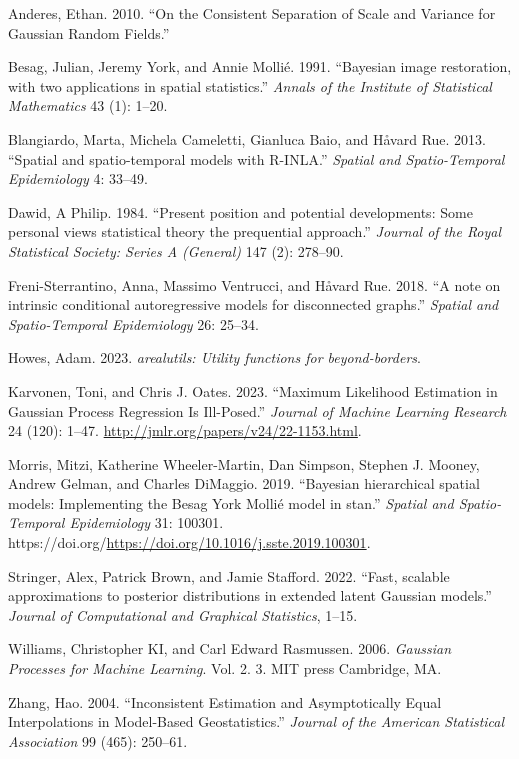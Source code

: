\documentclass[
  12pt,
]{article}
\newlength{\cslhangindent}
\newenvironment{CSLReferences}[2] %
 {\begin{list}{}{%
  \setlength{\itemindent}{0pt}
  \setlength{\leftmargin}{0pt}
  \setlength{\parsep}{0pt}
  \ifodd #1
   \setlength{\leftmargin}{\cslhangindent}
   \setlength{\itemindent}{-1\cslhangindent}
  \fi
  \setlength{\itemsep}{#2\baselineskip}}}
 {\end{list}}
\begin{document}
\label{refs}
\begin{CSLReferences}{1}{0}
Anderes, Ethan. 2010. {``On the Consistent Separation of Scale and
Variance for Gaussian Random Fields.''}

Besag, Julian, Jeremy York, and Annie Mollié. 1991. {``{Bayesian image
restoration, with two applications in spatial statistics}.''}
\emph{Annals of the Institute of Statistical Mathematics} 43 (1): 1--20.

Blangiardo, Marta, Michela Cameletti, Gianluca Baio, and Håvard Rue.
2013. {``{Spatial and spatio-temporal models with R-INLA}.''}
\emph{Spatial and Spatio-Temporal Epidemiology} 4: 33--49.

Dawid, A Philip. 1984. {``{Present position and potential developments:
Some personal views statistical theory the prequential approach}.''}
\emph{Journal of the Royal Statistical Society: Series A (General)} 147
(2): 278--90.

Freni-Sterrantino, Anna, Massimo Ventrucci, and Håvard Rue. 2018. {``{A
note on intrinsic conditional autoregressive models for disconnected
graphs}.''} \emph{Spatial and Spatio-Temporal Epidemiology} 26: 25--34.

Howes, Adam. 2023. \emph{{arealutils: Utility functions for
beyond-borders}}.

Karvonen, Toni, and Chris J. Oates. 2023. {``Maximum Likelihood
Estimation in Gaussian Process Regression Is Ill-Posed.''} \emph{Journal
of Machine Learning Research} 24 (120): 1--47.
\url{http://jmlr.org/papers/v24/22-1153.html}.

Morris, Mitzi, Katherine Wheeler-Martin, Dan Simpson, Stephen J. Mooney,
Andrew Gelman, and Charles DiMaggio. 2019. {``{Bayesian hierarchical
spatial models: Implementing the Besag York Mollié model in stan}.''}
\emph{Spatial and Spatio-Temporal Epidemiology} 31: 100301.
https://doi.org/\url{https://doi.org/10.1016/j.sste.2019.100301}.

Stringer, Alex, Patrick Brown, and Jamie Stafford. 2022. {``{Fast,
scalable approximations to posterior distributions in extended latent
Gaussian models}.''} \emph{Journal of Computational and Graphical
Statistics}, 1--15.

Williams, Christopher KI, and Carl Edward Rasmussen. 2006.
\emph{Gaussian Processes for Machine Learning}. Vol. 2. 3. MIT press
Cambridge, MA.

Zhang, Hao. 2004. {``Inconsistent Estimation and Asymptotically Equal
Interpolations in Model-Based Geostatistics.''} \emph{Journal of the
American Statistical Association} 99 (465): 250--61.

\end{CSLReferences}
\end{document}

